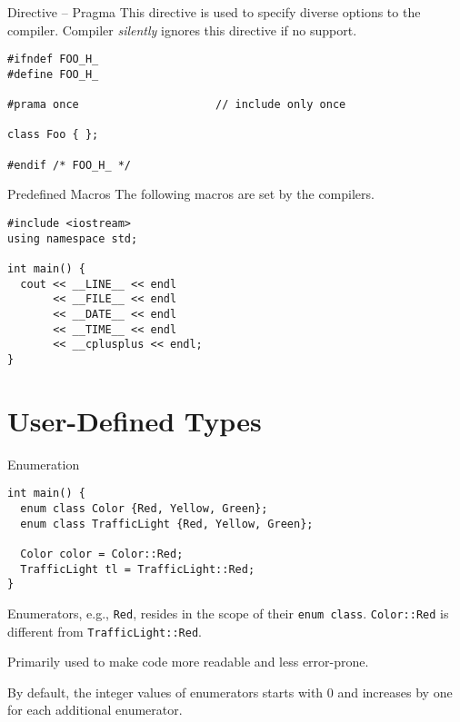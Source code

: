 \documentclass[presentation]{beamer}
\begin{document}
\begin{frame}[fragile,label={sec:orgheadline50}]{Directive -- Pragma}
 This directive is used to specify diverse options to the compiler.
Compiler \emph{silently} ignores this directive if no support.

\begin{verbatim}
#ifndef FOO_H_
#define FOO_H_

#prama once                     // include only once

class Foo { };

#endif /* FOO_H_ */
\end{verbatim}
\end{frame}

\begin{frame}[fragile,label={sec:orgheadline51}]{Predefined Macros}
 The following macros are set by the compilers.

\begin{verbatim}
#include <iostream>
using namespace std;

int main() {
  cout << __LINE__ << endl
       << __FILE__ << endl
       << __DATE__ << endl
       << __TIME__ << endl
       << __cplusplus << endl;
}
\end{verbatim}
\end{frame}

\section{User-Defined Types}
\label{sec:orgheadline59}

\begin{frame}[fragile,label={sec:orgheadline53}]{Enumeration}
 \begin{verbatim}
int main() {
  enum class Color {Red, Yellow, Green};
  enum class TrafficLight {Red, Yellow, Green};

  Color color = Color::Red;
  TrafficLight tl = TrafficLight::Red;
}
\end{verbatim}

Enumerators, e.g., \texttt{Red}, resides in the scope of their \texttt{enum
   class}.  \texttt{Color::Red} is different from \texttt{TrafficLight::Red}.

Primarily used to make code more readable and less error-prone.

By default, the integer values of enumerators starts with 0 and
increases by one for each additional enumerator.
\end{frame}
\end{document}
